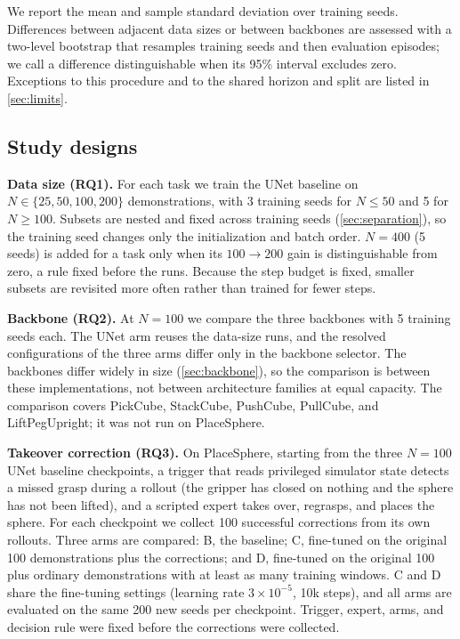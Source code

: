We report the mean and sample standard deviation over training seeds.
Differences between adjacent data sizes or between backbones are assessed with
a two-level bootstrap that resamples training seeds and then evaluation
episodes; we call a difference distinguishable when its 95\% interval excludes
zero.
Exceptions to this procedure and to the shared horizon and split are listed
in \cref{sec:limits}.

\subsection{Study designs}
\textbf{Data size (RQ1).} For each task we train the UNet baseline on
$N\in\{25,50,100,200\}$ demonstrations, with 3 training seeds for $N\le50$ and
5 for $N\ge100$. Subsets are nested and fixed across training seeds
(\cref{sec:separation}), so the training seed changes only the initialization
and batch order. $N=400$ (5 seeds) is added for a
task only when its $100\rightarrow200$ gain is distinguishable from zero, a
rule fixed before the runs. Because the step budget is fixed, smaller subsets
are revisited more often rather than trained for fewer steps.

\textbf{Backbone (RQ2).} At $N=100$ we compare the three backbones with 5
training seeds each. The UNet arm reuses the data-size runs, and the resolved
configurations of the three arms differ only in the backbone selector. The
backbones differ widely in size (\cref{sec:backbone}), so the comparison is
between these implementations, not between architecture families at equal
capacity.
The comparison covers PickCube, StackCube, PushCube, PullCube, and
LiftPegUpright; it was not run on PlaceSphere.

\textbf{Takeover correction (RQ3).} On PlaceSphere, starting from the three
$N=100$ UNet baseline checkpoints, a trigger that reads privileged simulator
state detects a missed grasp during a rollout (the gripper has closed on
nothing and the sphere has not been lifted), and a scripted expert takes over,
regrasps, and places the sphere. For each checkpoint we collect 100 successful
corrections from its own rollouts. Three arms are compared: B, the baseline;
C, fine-tuned on the original 100 demonstrations plus the corrections; and D,
fine-tuned on the original 100 plus ordinary demonstrations with at least as
many training windows. C and D share the fine-tuning settings (learning rate
$3\times10^{-5}$, 10k steps), and all arms are evaluated on the same 200 new
seeds per checkpoint. Trigger, expert, arms, and decision rule were fixed
before the corrections were collected.
